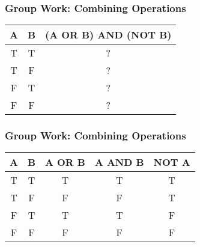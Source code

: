 \documentclass{beamer}
\begin{document}
%
%
\begin{frame}[fragile]
	\frametitle{Group Work: Combining Operations}
	\centering
	\begin{table}[]
		\begin{tabular}{|cc|c|}
			{\color[HTML]{CD9934} \textbf{A}} & {\color[HTML]{3531FF} \textbf{B}} & \textbf{(A OR B) AND (NOT B)} \\ \hline
			{\color[HTML]{CD9934} T}          & {\color[HTML]{3531FF} T}          & ?                             \\
			{\color[HTML]{CD9934} T}          & {\color[HTML]{3531FF} F}          & ?                             \\
			{\color[HTML]{CD9934} F}          & {\color[HTML]{3531FF} T}          & ?                             \\
			{\color[HTML]{CD9934} F}          & {\color[HTML]{3531FF} F}          & ?                           
		\end{tabular}
	\end{table}
\end{frame}

%
%
\begin{frame}[fragile]
	\frametitle{Group Work: Combining Operations}
	\centering
  \begin{table}[]
    \begin{tabular}{|cc|c|c|c|}
      {\color[HTML]{CD9934} \textbf{A}} & {\color[HTML]{3531FF} \textbf{B}} & \textbf{A OR B} & \textbf{A AND B} & \textbf{NOT A} \\ \hline
      {\color[HTML]{CD9934} T}          & {\color[HTML]{3531FF} T}          & T               & T                & T              \\
      {\color[HTML]{CD9934} T}          & {\color[HTML]{3531FF} F}          & F               & F                & T              \\
      {\color[HTML]{CD9934} F}          & {\color[HTML]{3531FF} T}          & T               & T                & F              \\
      {\color[HTML]{CD9934} F}          & {\color[HTML]{3531FF} F}          & F               & F                & F             
    \end{tabular}
  \end{table}
\end{frame}
\end{document}
